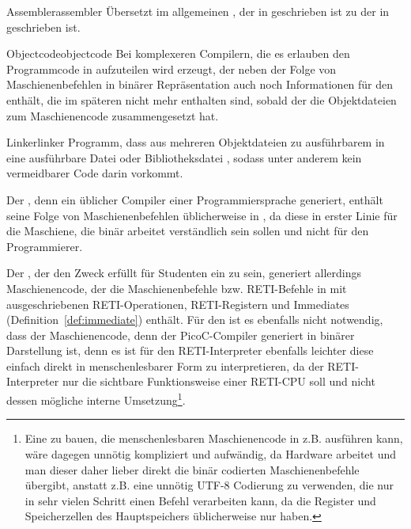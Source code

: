 \begin{Definition}{Assembler}{assembler}
  Übersetzt im allgemeinen , der in  geschrieben ist zu  der in  geschrieben ist.
\end{Definition}

\begin{Definition}{Objectcode}{objectcode}
  Bei komplexeren Compilern, die es erlauben den Programmcode in  aufzuteilen wird  erzeugt, der neben der Folge von Maschienenbefehlen in binärer Repräsentation auch noch Informationen für den  enthält, die im späteren  nicht mehr enthalten sind, sobald der  die Objektdateien zum Maschienencode zusammengesetzt hat.
\end{Definition}

\begin{Definition}{Linker}{linker}
  Programm, dass  aus mehreren Objektdateien zu ausführbarem  in eine ausführbare Datei oder Bibliotheksdatei , sodass unter anderem kein vermeidbarer  Code darin vorkommt.
\end{Definition}

Der , denn ein üblicher Compiler einer Programmiersprache generiert, enthält seine Folge von Maschienenbefehlen üblicherweise in , da diese in erster Linie für die Maschiene, die binär arbeitet verständlich sein sollen und nicht für den Programmierer.

Der , der den Zweck erfüllt für Studenten ein  zu sein, generiert allerdings Maschienencode, der die Maschienenbefehle bzw. RETI-Befehle in  mit ausgeschriebenen RETI-Operationen, RETI-Registern und Immediates (Definition~\ref{def:immediate}) enthält. Für den  ist es ebenfalls nicht notwendig, dass der Maschienencode, denn der PicoC-Compiler generiert in binärer Darstellung ist, denn es ist für den RETI-Interpreter ebenfalls leichter diese einfach direkt in menschenlesbarer Form zu interpretieren, da der RETI-Interpreter nur die sichtbare Funktionsweise einer RETI-CPU  soll und nicht dessen mögliche interne Umsetzung\footnote{Eine  zu bauen, die menschenlesbaren Maschienencode in z.B.  ausführen kann, wäre dagegen unnötig kompliziert und aufwändig, da Hardware  arbeitet und man dieser daher lieber direkt die binär codierten Maschienenbefehle übergibt, anstatt z.B. eine unnötig  UTF-8 Codierung zu verwenden, die nur in sehr vielen Schritt einen Befehl verarbeiten kann, da die Register und Speicherzellen des Hauptspeichers üblicherweise nur  haben.}.

